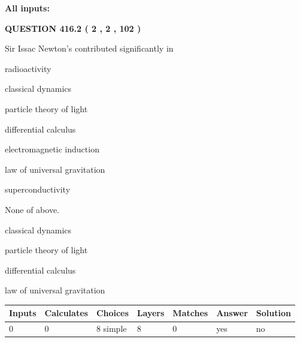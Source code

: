 \documentclass[12pt]{article}
\begin{document}
   
   
   
\noindent{}
   
   
   
   
\noindent\vspace{0.1in}\hspace{-0.08in} {\textbf{\Large{All inputs: }}}
   
   
  
\vspace{0.2in}
  
{\textbf{\Large{QUESTION
416.2 
 ( 2 , 2 , 102 )
}}}
  
  
Sir Issac Newton's contributed significantly in
 
 
radioactivity
 
 
classical dynamics
 
 
particle theory of light
 
 
differential calculus
 
 
electromagnetic induction
 
 
law of universal gravitation
 
 
superconductivity
 
 
 None of above.
 
 
\noindent{}
 
 
classical dynamics
 
 
particle theory of light
 
 
differential calculus
 
 
law of universal gravitation
 
 
\noindent{}
 
 
   
   
   
   
\noindent\begin{tabular}{|l|l|l|l|l|l|l|}
 \hline
Inputs & Calculates & Choices & Layers & Matches & Answer & Solution \\ \hline
 0  & 
 0  & 
 8
  simple  
  & 
 8  & 
 0  & 
  yes & 
  no 
  \\ \hline
 \end{tabular}
   
\end{document}
